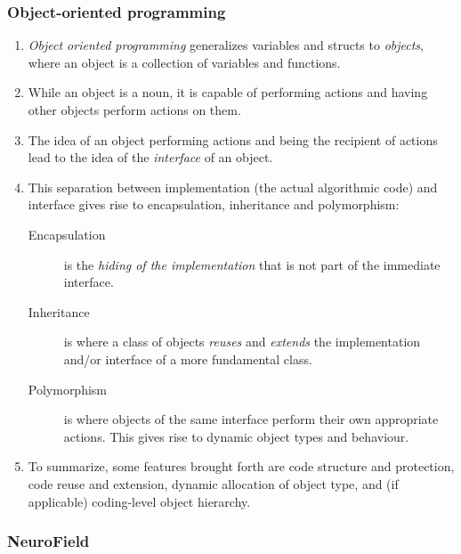 \documentclass[12pt,a4paper]{article}
\begin{document}
\subsubsection{Object-oriented programming}

\begin{enumerate}
\item \emph{Object oriented programming} generalizes variables and structs to \emph{objects}, where an object is a collection of variables and functions.

\item While an object is a noun, it is capable of performing actions and having other objects perform actions on them.

\item The idea of an object performing actions and being the recipient of actions lead to the idea of the \emph{interface} of an object.

\item This separation between implementation (the actual algorithmic code) and interface gives rise to encapsulation, inheritance and polymorphism:
    \begin{description}
        \item [Encapsulation] is the \emph{hiding of the implementation} that is not part of the immediate interface.
        \item [Inheritance] is where a class of objects \emph{reuses} and \emph{extends} the implementation and/or interface of a more fundamental class.
        \item [Polymorphism] is where objects of the same interface perform their own appropriate actions. This gives rise to dynamic object types and behaviour.
    \end{description}

\item To summarize, some features brought forth are code structure and protection, code reuse and extension, dynamic allocation of object type, and (if applicable) coding-level object hierarchy.
\end{enumerate}

\subsubsection{NeuroField}
\end{document}
